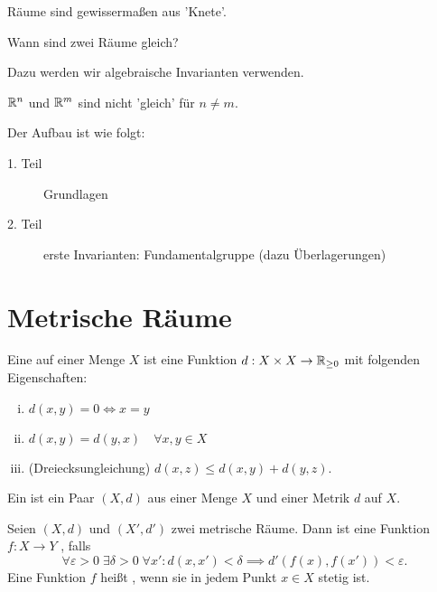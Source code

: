 \begin{idea}
    Räume sind gewissermaßen aus 'Knete'.
\end{idea}
\begin{goal}
    Wann sind zwei Räume gleich?
\end{goal}
Dazu werden wir algebraische Invarianten verwenden.
\begin{example}
    $\mathbb{R}^n$ und $\mathbb{R}^m$ sind nicht 'gleich' für $n\neq m$.
\end{example}
Der Aufbau ist wie folgt:
\begin{description}
    \item[1. Teil] Grundlagen
    \item[2. Teil] erste Invarianten: Fundamentalgruppe (dazu Überlagerungen)
\end{description}

\section{Metrische Räume}
\begin{definition}
    Eine  auf einer Menge $X$ ist eine Funktion  $d: X\times X \to  \mathbb{R}_{\geq 0}$ mit folgenden Eigenschaften:
    \begin{enumerate}[(i)]
        \item $d(x,y) = 0 \iff  x = y$
        \item $d(x,y) = d(y,x) \quad \forall x,y\in X$
        \item (Dreiecksungleichung) $d(x,z) \leq  d(x,y) + d(y,z)$.
    \end{enumerate}
    Ein  ist ein Paar $(X,d)$ aus einer Menge $X$ und einer Metrik $d$ auf $X$.
\end{definition}
\begin{definition}
    Seien $(X,d)$ und  $(X',d')$ zwei metrische Räume. Dann ist eine Funktion $f:X \to  Y$ , falls
    \[
        \forall ε > 0 \; \exists \delta > 0 \; \forall x' \colon d(x,x') < \delta \implies d'(f(x), f(x')) < ε
    .\] 
    Eine Funktion $f$ heißt , wenn sie in jedem Punkt  $x\in X$ stetig ist.
    \begin{minipage}{\textwidth}
        \centering
    \end{minipage}
\end{definition}


